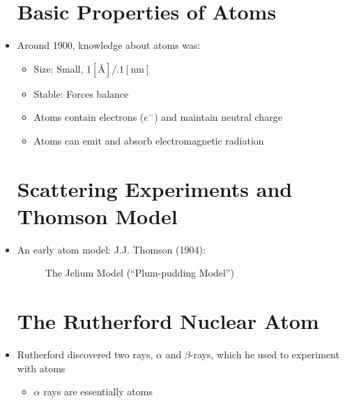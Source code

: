 \begin{itemize}

    \section{Basic Properties of Atoms}

  \item Around 1900, knowledge about atoms was:

    \begin{itemize}

      \item Size: Small, $1[\si{\angstrom}]/.1[\si{\nano\meter}]$

      \item Stable: Forces balance

      \item Atoms contain electrons ($e^-$) and maintain neutral charge

      \item Atoms can emit and absorb electromagnetic radiation

    \end{itemize}

    \section{Scattering Experiments and Thomson Model}

  \item An early atom model: J.J. Thomson (1904):

    \begin{figure}[h!]
      \centering
      
      \caption{The Jelium Model (``Plum-pudding Model'')}
      \label{fig:1}
    \end{figure}

    \section{The Rutherford Nuclear Atom}

  \item Rutherford discovered two rays, $\alpha$ and $\beta$-rays, which he used to experiment with atoms

    \begin{itemize}

      \item $\alpha$ rays are essentially  atoms

        \begin{itemize}


\end{itemize}
\end{itemize}
\end{itemize}
